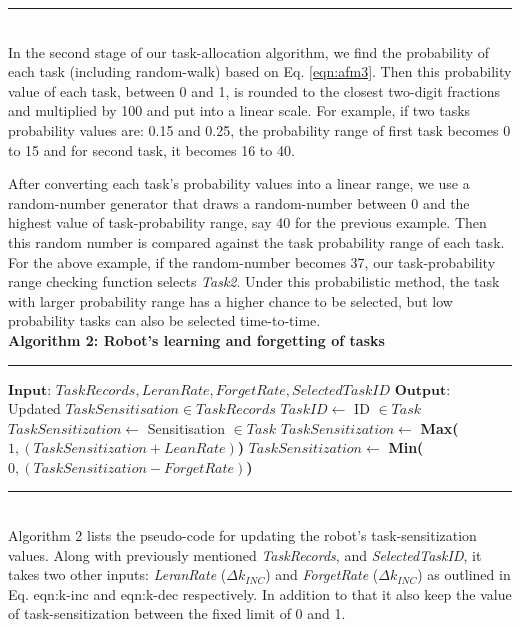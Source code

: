 \documentclass[final,5p,times,twocolumn]{elsarticle}
\newcommand{\HRule}{\rule{\linewidth}{0.3mm}}
\begin{document}
\vspace{-3mm} 
\HRule\\
In the second stage of our task-allocation algorithm, we  find the probability of each task (including random-walk) based on Eq. \ref{eqn:afm3}. Then this probability value of each task, between 0 and 1, is rounded to the closest two-digit fractions and multiplied by 100 and put into a linear scale. For example, if two tasks probability values are: 0.15 and  0.25, the probability range of first  task becomes 0 to 15 and for second task, it becomes 16 to 40.
 
After converting each task's probability values into a linear range, we use a random-number generator that draws a random-number between 0 and the highest value of task-probability range, say 40 for the previous example. Then this random number is compared against the task probability range of each task. For the above example, if the random-number becomes 37, our task-probability range checking function selects \textit{Task2}. Under this probabilistic method, the task with larger probability range has a  higher chance to be selected, but low probability tasks can also be selected time-to-time.\\

\textbf{Algorithm 2: Robot's learning and forgetting of tasks}
\vspace{-3mm}
\newline
\HRule
\begin{algorithmic}[1]
\begin{small}
\label{alg:update-sz}
\State $\textbf{Input: }  TaskRecords, LeranRate, ForgetRate, SelectedTaskID$
\State $\textbf{Output: }$ Updated $TaskSensitisation \in TaskRecords$
\State $ TaskID \gets  $ ID $\in Task$
\State $ TaskSensitization \gets  $   Sensitisation $ \in Task$
\State $ TaskSensitization \gets $ \textbf{Max(}$1, (TaskSensitization + LeanRate)$\textbf{)}
\Else
\State $ TaskSensitization \gets $ \textbf{Min(}$0, (TaskSensitization - ForgetRate)$\textbf{)}
\EndIf
\EndFor
\end{small}
\end{algorithmic}
\vspace{-3mm} 
\HRule\\

Algorithm 2 lists the pseudo-code for updating the robot's task-sensitization values. Along with previously mentioned \textit{TaskRecords}, and  \textit{SelectedTaskID}, it takes two other inputs: \textit{LeranRate} ($\Delta k_{INC} $) and \textit{ForgetRate} ($\Delta k_{INC} $) as outlined in Eq. {eqn:k-inc} and {eqn:k-dec} respectively.  In addition to that it also keep the value of task-sensitization between the fixed limit of 0 and 1.
\end{document}
